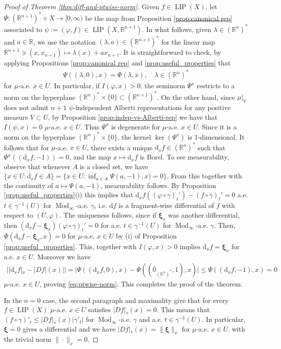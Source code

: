 \documentclass{amsart}
\numberwithin{equation}{section}
\newcommand{\R}{\mathbb{R}}
\newcommand{\Mod}{\operatorname{Mod}}
\newcommand{\LIP}{\operatorname{LIP}}
\newcommand{\ud}{\mathrm {d}}
\newcommand{\inv}{^{-1}}
\begin{document}
\begin{proof}[Proof of Theorem \ref{thm:diff-and-ptwise-norm}]
	Given $f\in \LIP(X)$, let $\Psi:(\R^{n+1})^*\times X\to [0,\infty)$ be the map from Proposition \ref{prop:canonical rep} associated to $\psi:=(\varphi,f)\in \LIP(X,\R^{n+1})$. In what follows, given $\lambda\in (\R^n)^*$ and $a\in \R$, we use the notation $(\lambda,a)\in (\R^{n+1})^*$ for the linear map $\R^{n+1}\ni (x,x_{n+1})\mapsto \lambda(x)+ax_{n+1}$. It is straightforward to check, by applying Propositions \ref{prop:canonical rep} and \ref{prop:useful_properties} that
	\begin{align*}
		\Psi((\lambda,0),x)=\Phi(\lambda,x),\quad \lambda\in (\R^n)^*
	\end{align*}
	for $\mu$-a.e. $x\in U$. In particular, if $I(\varphi,x)>0$, the seminorm $\Psi^x$ restricts to a norm on the hyperplane $(\R^n)^*\times\{0\}\subset (\R^{n+1})^*$. On the other hand, since $\mu|_V$ does not admit $n+1$ $\psi$-independent Alberti representations for any positive measure $V\subset U$, by Proposition \ref{prop:indep-vs-Alberti-rep} we have that $I(\psi,x)=0$ $\mu$-a.e. $x\in U$. Thus $\Psi^x$ is degenerate for $\mu$-a.e. $x\in U$. Since it is a norm on the hyperplane $(\R^n)^*\times\{0\}$, the kernel $\ker(\Psi^x)$ is 1-dimensional. It follows that for $\mu$-a.e. $x\in U$, there exists a unique $\ud_xf\in (\R^n)^*$ such that $\Psi^x((\ud_xf,-1))=0$, and the map $x\mapsto \ud_xf$ is Borel. To see measurability, observe that whenever $A$ is a closed set, we have $\{x\in U : \ud_x f \in A\}=\{x\in U: \inf_{a\in A} \Psi(a,-1),x)=0\}$. From this together with the continuity of $a\mapsto \Psi(a,-1)$, measurability follows.  By Proposition \ref{prop:useful_properties}(i) this implies that $\ud_xf((\varphi\circ\gamma)_t')-(f\circ\gamma)_t'=0$ a.e. $t\in \gamma\inv(U)$ for $\Mod_\infty$-a.e. $\gamma$, i.e. $\ud f$ is a fragment-wise differential of $f$ with respect to $(U,\varphi)$.  The uniqueness follows, since if $\bm\xi_x$ was another differential, then $(\ud_xf-\bm\xi_x)(\varphi\circ\gamma)_t'=0$ for a.e. $t\in \gamma\inv(U)$ for $\Mod_\infty$-a.e. $\gamma$. Then, $\Phi(\ud_xf-\bm\xi_x,x)=0$ for $\mu$-a.e. $x\in U$ by (i) of Proposition \ref{prop:useful_properties}. This, together with $I(\varphi,x)>0$ implies $\ud_x f = \bm\xi_x$ for a.e. $x\in U$.  Moreover we have 
	\begin{align*}
		||\ud_xf|_x-|Df|(x)||=|\Psi((\ud_xf,0),x)-\Psi((\bar 0_{(\R^n)^*},1),x)|\le \Psi((\ud_xf,-1),x)=0
	\end{align*}
	$\mu$-a.e. $x\in U$, proving \eqref{eq:ptwise-norm}. This completes the proof of the theorem.

   In the $n=0$ case, the second paragraph and maximality give that for every $f\in \LIP(X)$ $\mu$-a.e. $x\in U$ satisfies $|Df|_*(x)=0$. This means that $(f\circ \gamma)'_t\leq |Df|_*(x)|\gamma'_t|$ for $\Mod_\infty$-a.e. $\gamma$ and a.e. $t\in \gamma\inv(U)$. In particular, $\bm\xi=0$ gives a differential and we have $|Df|_*(x)=\|\bm\xi\|_x$ for $\mu$-a.e. $x\in U$. with the trivial norm $\|\cdot\|_x=0$.
\end{proof}
\end{document}
